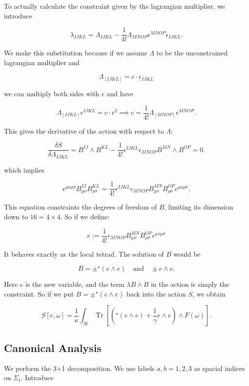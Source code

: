 \documentclass{article}
\begin{document}
To actually calculate the constraint given by the lagrangian multiplier, we introduce

$$
\lambda_{IJKL} = \Lambda_{IJKL} - \frac{1}{4!}\Lambda_{MNOP}\epsilon^{MNOP}\epsilon_{IJKL}.
$$

We make this substitution because if we assume $\Lambda$ to be the unconstrained lagrangian multiplier and

$$
\Lambda_{[IJKL]} = c\cdot\epsilon_{IJKL}
$$

we can multiply both sides with $\epsilon$ and have

$$
\Lambda_{[IJKL]}\epsilon^{IJKL} = c\cdot\epsilon^2\implies c = \frac{1}{4!}\Lambda_{[MNOP]}\epsilon^{MNOP}.
$$

This gives the derivative of the action with respect to $\Lambda$:

$$
\frac{\delta S}{\delta \Lambda_{IJKL}} = B^{IJ}\wedge B^{KL} - \frac{1}{4!}\epsilon^{IJKL}\epsilon_{MNOP}B^{MN}\wedge B^{OP} = 0.
$$

which implies

$$
\epsilon^{\mu\nu\rho\sigma} B^{IJ}_{\mu\nu} B^{KL}_{\rho\sigma} = \frac{1}{4!} \epsilon^{IJKL} \epsilon_{MNOP} B^{MN}_{\mu\nu} B^{OP}_{\rho\sigma} \epsilon^{\mu\nu\rho\sigma}.
$$

This equation constraints the degrees of freedom of $B$, limiting its dimension down to $16 = 4\times 4$. So if we define:

$$
e := \frac{1}{4!} \epsilon_{MNOP} B^{MN}_{\mu\nu} B^{OP}_{\rho\sigma} \epsilon^{\mu\nu\rho\sigma}
$$

It behaves exactly as the local tetrad. The solution of $B$ would be

$$
B = \pm ^\star(e\wedge e) \quad\text{and}\quad \pm e\wedge e.
$$

Here $e$ is the new variable, and the term $\lambda B\wedge B$ in the action is simply the constraint. So if we put $B = \pm^\star(e\wedge e)$ back into the action $S$, we obtain

$$
S[e, \omega] = \frac{1}{\kappa}\int_\mathcal{M} \operatorname{Tr}\left[\left(^\star(e\wedge e) + \frac{1}{\gamma}e\wedge e\right) \wedge F(\omega)\right].
$$

\subsection{Canonical Analysis}

We perform the 3+1 decomposition. We use labels $a,b = 1,2,3$ as spacial indices on $\Sigma_t$. Introduce
\end{document}
